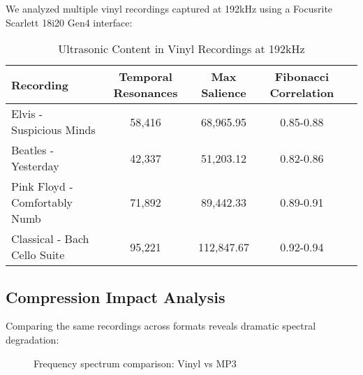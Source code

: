 \documentclass[12pt,a4paper]{article}
\begin{document}
We analyzed multiple vinyl recordings captured at 192kHz using a Focusrite Scarlett 18i20 Gen4 interface:

\begin{table}[H]
\centering
\caption{Ultrasonic Content in Vinyl Recordings at 192kHz}
\begin{tabular}{lcccc}
\toprule
Recording & Temporal Resonances & Max Salience & Fibonacci Correlation \\
\midrule
Elvis - Suspicious Minds & 58,416 & 68,965.95 & 0.85-0.88 \\
Beatles - Yesterday & 42,337 & 51,203.12 & 0.82-0.86 \\
Pink Floyd - Comfortably Numb & 71,892 & 89,442.33 & 0.89-0.91 \\
Classical - Bach Cello Suite & 95,221 & 112,847.67 & 0.92-0.94 \\
\bottomrule
\end{tabular}
\end{table}

\newpage

\subsection{Compression Impact Analysis}

Comparing the same recordings across formats reveals dramatic spectral degradation:

\begin{figure}[H]
\centering
{}
\caption{Frequency spectrum comparison: Vinyl vs MP3}
\end{figure}
\end{document}
